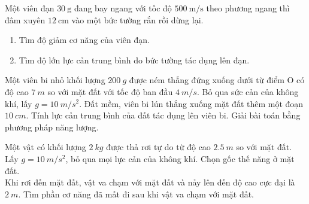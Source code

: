 \begin{ex}
	Một viên đạn $\SI{30}{\gram}$ đang bay ngang với tốc độ $\SI{500}{\meter/\second}$ theo phương ngang thì đâm xuyên $\SI{12}{\centi\meter}$ vào một bức tường rắn rồi dừng lại.
	\begin{enumerate}[label=\alph*)]
		\item Tìm độ giảm cơ năng của viên đạn.
		\item Tìm độ lớn lực cản trung bình do bức tường tác dụng lên đạn.
	\end{enumerate}
\end{ex}
\begin{ex}
	Một viên bi nhỏ khối lượng $\SI{200}{g}$ được ném thẳng đứng xuống dưới từ điểm O có độ cao $\SI{7}{m}$ so với mặt đất với tốc độ ban đầu $\SI{4}{m/s}$. Bỏ qua sức cản của không khí, lấy $g=\SI{10}{m/s^2}$.  Đất mềm, viên bi lún thẳng xuống mặt đất thêm một đoạn $\SI{10}{cm}$. Tính lực cản trung bình của đất tác dụng lên viên bi. Giải bài toán bằng phương pháp năng lượng.
\end{ex}
\begin{ex}
		Một vật có khối lượng $\SI{2}{kg}$ được thả rơi tự do từ độ cao $\SI{2.5}{m}$ so với mặt đất. Lấy $g=\SI{10}{m/s^2}$, bỏ qua mọi lực cản của không khí. Chọn gốc thế năng ở mặt đất.\\
	Khi rơi đến mặt đất, vật va chạm với mặt đất và nảy lên đến độ cao cực đại là $\SI{2}{m}$. Tìm phần cơ năng đã mất đi sau khi vật va chạm với mặt đất.
\end{ex}

